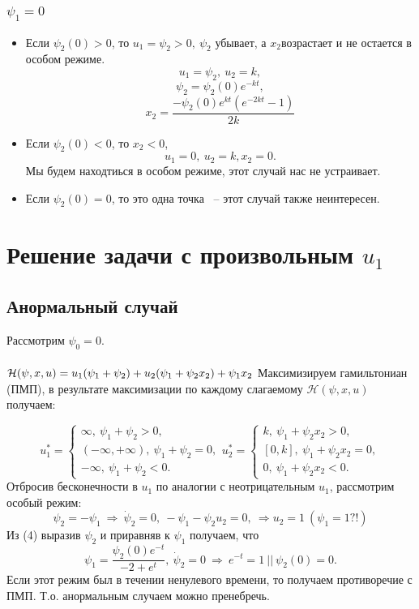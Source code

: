 \documentclass[12pt, fleqn]{article}
\begin{document}
\subsubsection{$\psi_1 = 0$}
\begin{itemize}
\item
Если $\psi_2(0) > 0$, то $u_1 = \psi_2 > 0, \ \psi_2$ убывает, а $x_2$возрастает и не остается в особом режиме.
\begin{equation}
u_1 = \psi_2, \ u_2 = k,
\end{equation}
\begin{equation}
\psi_2 = \psi_2(0)e^{-kt},
\end{equation}
\begin{equation}
x_2 = \frac{-\psi_2(0)e^{kt}(e^{-2kt} - 1)}{2k}
\end{equation}
\item
Если $\psi_2(0) < 0$, то $x_2 < 0$,
\begin{equation}
u_1 = 0, \ u_2 = k, x_2 = 0.
\end{equation}
Мы будем находтиься в особом режиме, этот случай нас не устраивает.
\item
Если $\psi_2(0) = 0$, то это одна точка ~-- этот случай также неинтересен.
\end{itemize}
\section{Решение задачи с произвольным $u_1$}
\subsection{Анормальный случай}
Рассмотрим $\psi_0 = 0$.\\\\
$
\mathcal{H}(\psi, x, u) = u_1(\psi_1 + \psi_2) + u_2(\psi_1 + \psi_2x_2) + \psi_1x_2\\\\
$
Максимизируем гамильтониан (ПМП), в результате максимизации по каждому слагаемому $\mathcal{H}(\psi, x, u)$ получаем:

$$
u_1^* = \begin{cases}
\infty, \ \psi_1 + \psi_2 > 0,\\
(-\infty, +\infty), \ \psi_1 + \psi_2 = 0, \\
-\infty, \ \psi_1 + \psi_2 < 0.
\end{cases}
u_2^* =  \begin{cases}
k, \ \psi_1 + \psi_2x_2 > 0,\\
[0, k], \ \psi_1 + \psi_2x_2 = 0, \\
0, \ \psi_1 + \psi_2x_2 < 0.
\end{cases}
$$
Отбросив бесконечности в $u_1$ по аналогии с неотрицательным $u_1$, рассмотрим особый режим:
$$
\psi_2 = -\psi_1 \ \Rightarrow \ \dot{\psi}_2 = 0, \ -\psi_1 -\psi_2u_2 = 0, \ \Rightarrow u_2 = 1 \ (\psi_1 = 1 ?!)
$$
Из (4) выразив $\psi_2$ и приравняв к $\psi_1$ получаем, что
$$
\psi_1 = \frac{\psi_2(0)e^{-t}}{-2 + e^t}, \ \dot{\psi}_2 = 0 \ \Rightarrow \ e^{-t} = 1 \ ||\  \psi_2(0) = 0.
$$
Если этот режим был в течении ненулевого времени, то получаем противоречие с ПМП. Т.о. анормальным случаем можно пренебречь.
\end{document}
